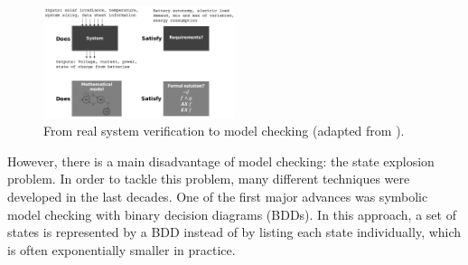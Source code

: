 \documentclass[journal]{IEEEtran}
\begin{document}
\begin{figure}[h]
\includegraphics[width=0.5\textwidth]{systemverif2}
\centering
\caption{From real system verification to model checking (adapted from \cite{ClarkeHV18}).}
\label{fig:systemverif}
\end{figure}

However, there is a main disadvantage of model checking: the state explosion problem. In order to tackle this problem, many different techniques were developed in the last decades. One of the first major advances was symbolic model checking with binary decision diagrams (BDDs). In this approach, a set of states is represented by a BDD instead of by listing each state individually, which is often exponentially smaller in practice.
\end{document}
